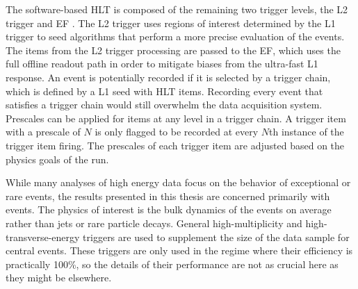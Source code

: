 The software-based \ac{HLT} is composed of the remaining two trigger levels, the \ac{L2} trigger and \ac{EF} \cite{ATLAS:2003aa}.  %
The \ac{L2} trigger uses regions of interest determined by the \ac{L1} trigger to seed algorithms that perform a more precise evaluation of the events.
The items from the \ac{L2} trigger processing are passed to the \ac{EF}, which uses the full offline readout path in order to mitigate biases from the ultra-fast \ac{L1} response.
An event is potentially recorded if it is selected by a trigger chain, which is defined by a \ac{L1} seed with \ac{HLT} items.
Recording every event that satisfies a trigger chain would still overwhelm the data acquisition system.
Prescales can be applied for items at any level in a trigger chain.
A trigger item with a prescale of $N$ is only flagged to be recorded at every $N$th instance of the trigger item firing.
The prescales of each trigger item are adjusted based on the physics goals of the run.

While many analyses of high energy data focus on the behavior of exceptional or rare events, the results presented in this thesis are concerned primarily with \minbias events.
The physics of interest is the bulk dynamics of the events on average rather than jets or rare particle decays.
General high-multiplicity and high-transverse-energy triggers are used to supplement the size of the data sample for central events.
These triggers are only used in the regime where their efficiency is practically 100\%, so the details of their performance are not as crucial here as they might be elsewhere.

